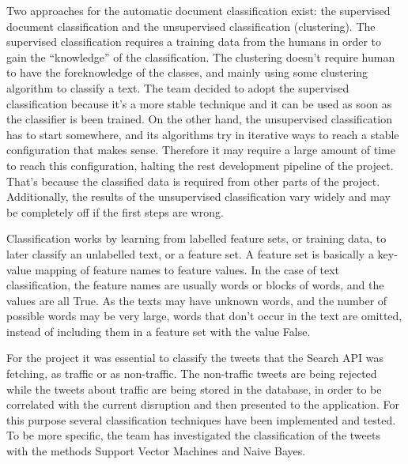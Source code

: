 Two approaches for the automatic document classification exist: the supervised document classification and the unsupervised classification (clustering). The supervised classification requires a training data from the humans in order to gain the “knowledge” of the classification. The clustering doesn’t require human to have the foreknowledge of the classes, and mainly using some clustering algorithm to classify a text. The team decided to adopt the supervised classification because it’s a more stable technique and it can be used as soon as the classifier is been trained. On the other hand, the unsupervised classification has to start somewhere, and its algorithms try in iterative ways to reach a stable configuration that makes sense. Therefore it may require a large amount of time to reach this configuration, halting the rest development pipeline of the project. That’s because the classified data is required from other parts of the project. Additionally, the results of the unsupervised classification vary widely and may be completely off if the first steps are wrong.

Classification works by learning from labelled feature sets, or training data, to later classify an unlabelled text, or a feature set. A feature set is basically a key-value mapping of feature names to feature values. In the case of text classification, the feature names are usually words or blocks of words, and the values are all True. As the texts may have unknown words, and the number of possible words may be very large, words that don't occur in the text are omitted, instead of including them in a feature set with the value False.

For the project it was essential to classify the tweets that the Search API was fetching, as traffic or as non-traffic. The non-traffic tweets are being rejected while the tweets about traffic are being stored in the database, in order to be correlated with the current disruption and then presented to the application. For this purpose several classification techniques have been implemented and tested. To be more specific, the team has investigated the classification of the tweets with the methods Support Vector Machines and Naive Bayes. 

